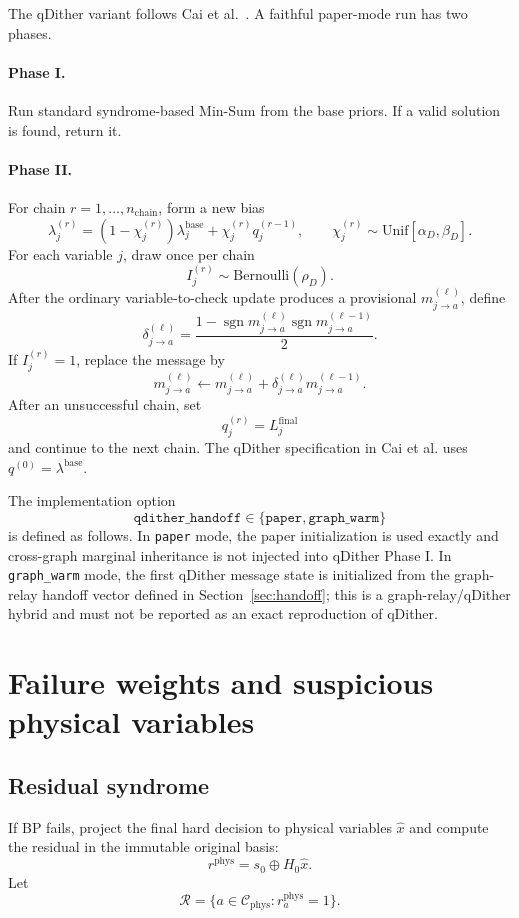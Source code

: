 \documentclass[11pt,a4paper]{article}
\newcommand{\Cphys}{\mathcal C_{\mathrm{phys}}}
\newcommand{\sgn}{\operatorname{sgn}}
\begin{document}
The qDither variant follows Cai et al.~\cite{qdither}. A faithful paper-mode
run has two phases.

\paragraph{Phase I.}
Run standard syndrome-based Min-Sum from the base priors. If a valid solution
is found, return it.

\paragraph{Phase II.}
For chain $r=1,\ldots,n_{\mathrm{chain}}$, form a new bias
\[
\lambda_j^{(r)}
=
(1-\chi_j^{(r)})\lambda_j^{\mathrm{base}}
+
\chi_j^{(r)}q_j^{(r-1)},
\qquad
\chi_j^{(r)}\sim\mathrm{Unif}[\alpha_D,\beta_D].
\]
For each variable $j$, draw once per chain
\[
I_j^{(r)}\sim\mathrm{Bernoulli}(\rho_D).
\]
After the ordinary variable-to-check update produces a provisional
$m_{j\to a}^{(\ell)}$, define
\[
\delta_{j\to a}^{(\ell)}
=
\frac{
1-
\sgn m_{j\to a}^{(\ell)}
\sgn m_{j\to a}^{(\ell-1)}
}{2}.
\]
If $I_j^{(r)}=1$, replace the message by
\[
m_{j\to a}^{(\ell)}
\leftarrow
m_{j\to a}^{(\ell)}
+
\delta_{j\to a}^{(\ell)}
m_{j\to a}^{(\ell-1)}.
\]
After an unsuccessful chain, set
\[
q_j^{(r)}=L_j^{\mathrm{final}}
\]
and continue to the next chain. The qDither specification in Cai et al. uses
$q^{(0)}=\lambda^{\mathrm{base}}$.

The implementation option
\[
\texttt{qdither\_handoff}\in
\{\texttt{paper},\texttt{graph\_warm}\}
\]
is defined as follows. In \texttt{paper} mode, the paper initialization is used
exactly and cross-graph marginal inheritance is not injected into qDither
Phase I. In \texttt{graph\_warm} mode, the first qDither message state is
initialized from the graph-relay handoff vector defined in
Section~\ref{sec:handoff}; this is a graph-relay/qDither hybrid and must not be
reported as an exact reproduction of qDither.

\section{Failure weights and suspicious physical variables}

\subsection{Residual syndrome}

If BP fails, project the final hard decision to physical variables $\hat x$
and compute the residual in the immutable original basis:
\[
r^{\mathrm{phys}}
=
s_0\oplus H_0\hat x.
\]
Let
\[
\mathcal R
=
\{a\in\Cphys:r_a^{\mathrm{phys}}=1\}.
\]
\end{document}
